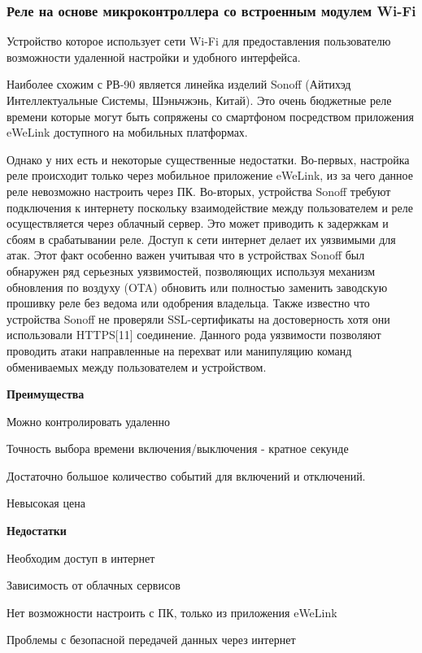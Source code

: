\subsubsection*{Реле на основе микроконтроллера со встроенным модулем Wi-Fi}

Устройство которое использует сети Wi-Fi для предоставления пользователю возможности удаленной настройки и удобного интерфейса. 

Наиболее схожим с РВ-90 является линейка изделий Sonoff (Айтихэд Интеллектуальные Системы, Шэньчжэнь, Китай). Это очень бюджетные реле времени которые могут быть сопряжены со смартфоном посредством приложения eWeLink доступного на мобильных платформах. 

Однако у них есть и некоторые существенные недостатки. Во-первых, настройка реле происходит только через мобильное приложение eWeLink, из за чего данное реле невозможно настроить через ПК. Во-вторых, устройства Sonoff требуют подключения к интернету поскольку взаимодействие между пользователем и реле осуществляется через облачный сервер. Это может приводить к задержкам и сбоям в срабатывании реле.  Доступ к сети интернет делает их уязвимыми для атак.  Этот факт особенно важен учитывая что в устройствах Sonoff был обнаружен ряд серьезных уязвимостей, позволяющих используя механизм обновления по воздуху (OTA) обновить или полностью заменить заводскую прошивку реле без ведома или одобрения владельца. Также известно что устройства Sonoff не проверяли SSL-сертификаты на достоверность хотя они использовали HTTPS[11] соединение. Данного рода уязвимости позволяют проводить атаки направленные на перехват или манипуляцию команд обмениваемых между пользователем и устройством.

\textbf{Преимущества}
\begin{my_enumerate}
\item Можно контролировать удаленно
\item Точность выбора времени включения/выключения - кратное секунде
\item Достаточно большое количество событий для включений и отключений.
\item Невысокая цена
\end{my_enumerate}

\textbf{Недостатки}
\begin{my_enumerate}
\item Необходим доступ в интернет
\item Зависимость от облачных сервисов
\item Нет возможности настроить с ПК, только из приложения eWeLink
\item Проблемы с безопасной передачей данных через интернет
\end{my_enumerate}


